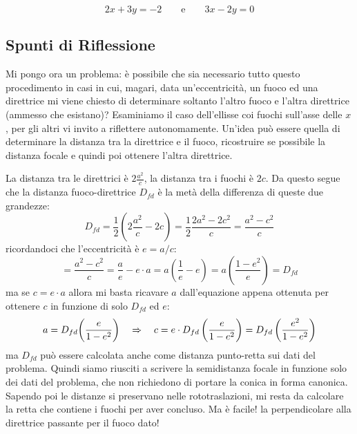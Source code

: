 \documentclass[a4paper, oneside]{article}
\begin{document}
\begin{itemize}
				\begin{equation*}
					2x+3y=-2 \qquad \mathrm{e} \qquad 3x-2y=0
				\end{equation*}			
			\end{itemize}
			
		\subsection{Spunti di Riflessione}
			Mi pongo ora un problema: è possibile che sia necessario tutto questo procedimento in casi in cui, magari, data un'eccentricità, un fuoco ed una direttrice mi viene chiesto di determinare soltanto l'altro fuoco e l'altra direttrice (ammesso che esistano)?
			Esaminiamo il caso dell'ellisse coi fuochi sull'asse delle $x$, per gli altri vi invito a riflettere autonomamente.
			Un'idea può essere quella di determinare la distanza tra la direttrice e il fuoco, ricostruire se possibile la distanza focale e quindi poi ottenere l'altra direttrice.
			
			La distanza tra le direttrici è $\displaystyle 2\frac{a^2}{c}$, la distanza tra i fuochi è $2c$. Da questo segue che la distanza fuoco-direttrice $D_{fd}$ è la metà della differenza di queste due grandezze:
			\begin{equation*}
				D_{fd}= \frac{1}{2}\left( 2\frac{a^2}{c} - 2c \right) = \frac{1}{2}\frac{2a^2-2c^2}{c}=\frac{a^2-c^2}{c}
			\end{equation*}
			ricordandoci che l'eccentricità è $e=a/c$:
			\begin{equation*}
				=\frac{a^2-c^2}{c} = \frac{a}{e}-e\cdot a = a\left( \frac{1}{e}-e \right)= a\left( \frac{1-e^2}{e} \right)=D_{fd}
			\end{equation*}
			ma se $c=e\cdot a$ allora mi basta ricavare $a$ dall'equazione appena ottenuta per ottenere $c$ in funzione di solo $D_{fd}$ ed $e$:
			\begin{equation*}
				a=D_{fd}{\left( \frac{e}{1-e^2} \right)} \quad \Rightarrow \quad c=e\cdot D_{fd}\left( \frac{e}{1-e^2}\right) = D_{fd}\left( \frac{e^2}{1-e^2}\right)
			\end{equation*}
			ma $D_{fd}$ può essere calcolata anche come distanza punto-retta sui dati del problema. Quindi siamo riusciti a scrivere la semidistanza focale in funzione solo dei dati del problema, che non richiedono di portare la conica in forma canonica. Sapendo poi le distanze si preservano nelle rototraslazioni, mi resta da calcolare la retta che contiene i fuochi per aver concluso. Ma è facile! \Egrave la perpendicolare alla direttrice passante per il fuoco dato! 
			
\end{document}
